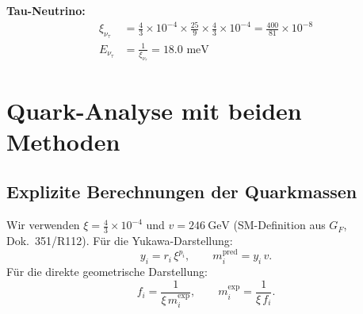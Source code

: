 \textbf{Tau-Neutrino:}
\begin{align}
	\xi_{\nu_\tau} &= \frac{4}{3} \times 10^{-4} \times \frac{25}{9} \times \frac{4}{3} \times 10^{-4} = \frac{400}{81} \times 10^{-8} \\
	E_{\nu_\tau} &= \frac{1}{\xi_{\nu_\tau}} = 18.0 \text{ meV}
\end{align}

\section{Quark-Analyse mit beiden Methoden}
\label{sec:quark_analysis}

\subsection{Explizite Berechnungen der Quarkmassen}
\label{subsec:quark_calculations}

Wir verwenden $\xi=\tfrac{4}{3}\times10^{-4}$ und $v=246\ \mathrm{GeV}$ (SM-Definition aus $G_F$, Dok.~351/R112).
Für die Yukawa-Darstellung:
\[
y_i = r_i\,\xi^{p_i},\qquad m_i^{\text{pred}}=y_i\,v.
\]
Für die direkte geometrische Darstellung:
\[
f_i=\frac{1}{\xi\, m_i^{\text{exp}}},\qquad m_i^{\text{exp}}=\frac{1}{\xi\, f_i}.
\]

\begin{table}[H]
	\centering
	\caption{Yukawa-Vorhersagen mit korrigierten $r_i,p_i$ und Vergleich mit den Massen nach PDG 2024.}
	\label{tab:quark_yukawa_predictions}
\end{table}

